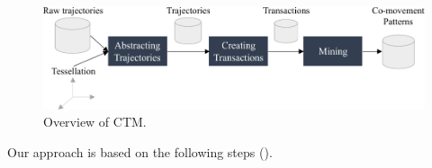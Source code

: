 \documentclass[
]{ceurart}
\begin{document}

\begin{figure}[t]
    \centering
    \includegraphics[scale=.7]{overview.pdf}
    \caption{Overview of CTM.}
    \label{fig:overview}
\end{figure}

Our approach is based on the following steps ().
\end{document}
